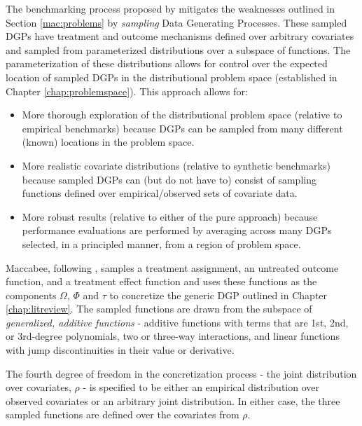 \documentclass[../main.tex]{subfiles}
\begin{document}
The benchmarking process proposed by \textcite{Dorie2019Automated1} mitigates the weaknesses outlined in Section \ref{mac:problems} by \textit{sampling} Data Generating Processes. These sampled DGPs have treatment and outcome mechanisms defined over arbitrary covariates and sampled from parameterized distributions over a subspace of functions. The parameterization of these distributions allows for control over the expected location of sampled DGPs in the distributional problem space (established in Chapter \ref{chap:problemspace}). This approach allows for:

\begin{itemize}
    \item More thorough exploration of the distributional problem space (relative to empirical benchmarks) because DGPs can be sampled from many different (known) locations in the problem space.

    \item More realistic covariate distributions (relative to synthetic benchmarks) because sampled DGPs can (but do not have to) consist of sampling functions defined over empirical/observed sets of covariate data.

    \item More robust results (relative to either of the pure approach) because performance evaluations are performed by averaging across many DGPs selected, in a principled manner, from a region of problem space.
\end{itemize}

Maccabee, following \textcite{Dorie2019Automated1}, samples a treatment assignment, an untreated outcome function, and a treatment effect function and uses these functions as the components $\Omega$, $\Phi$ and $\tau$ to concretize the generic DGP outlined in Chapter \ref{chap:litreview}. The sampled functions are drawn from the subspace of \textit{generalized, additive functions} - additive functions with terms that are 1st, 2nd, or 3rd-degree polynomials, two or three-way interactions, and linear functions with jump discontinuities in their value or derivative.

\vspace{\baselineskip}

The fourth degree of freedom in the concretization process - the joint distribution over covariates, $\rho$ - is specified to be either an empirical distribution over observed covariates or an arbitrary joint distribution. In either case, the three sampled functions are defined over the covariates from $\rho$.
\end{document}
